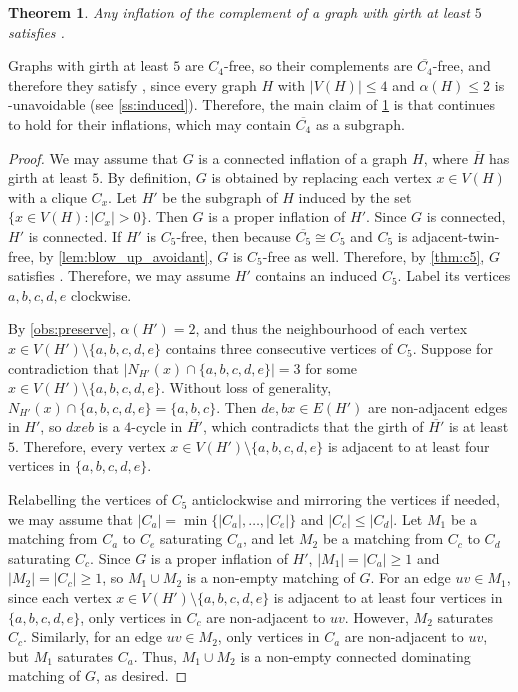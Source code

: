\documentclass[11pt]{article}
\numberwithin{equation}{section}
\theoremstyle{plain}
\newtheorem{thm}[equation]{Theorem}
\theoremstyle{definition}
\renewcommand{\geq}{\geqslant}
\renewcommand{\leq}{\leqslant}
\begin{document}
\begin{thm}
    \label{thm:girth_5}
    Any inflation of the complement of a graph with girth at least $5$ satisfies .
\end{thm}
Graphs with girth at least $5$ are $C_4$-free, so their complements are $\overline{C_4}$-free, and therefore they satisfy , since every graph $H$ with $|V(H)| \leq 4$ and $\alpha(H) \leq 2$ is -unavoidable (see \cref{ss:induced}). Therefore, the main claim of \cref{thm:girth_5} is that  continues to hold for their inflations, which may contain $\overline{C_4}$ as a subgraph.
\begin{proof}
    We may assume that $G$ is a connected inflation of a graph $H$, where $\overline{H}$ has girth at least $5$. By definition, $G$ is obtained by replacing each vertex $x \in V(H)$ with a clique $C_x$. Let $H'$ be the subgraph of $H$ induced by the set $\{x \in V(H): |C_x| > 0\}$. Then $G$ is a proper inflation of $H'$. Since $G$ is connected, $H'$ is connected. If $H'$ is $C_5$-free, then because $\overline{C_5} \cong C_5$ and $C_5$ is adjacent-twin-free, by \cref{lem:blow_up_avoidant}, $G$ is $C_5$-free as well. Therefore, by \cref{thm:c5}, $G$ satisfies . Therefore, we may assume $H'$ contains an induced $C_5$. Label its vertices $a,b,c,d,e$ clockwise.

    By \cref{obs:preserve}, $\alpha(H') = 2$, and thus the neighbourhood of each vertex $x \in V(H') \setminus \{a,b,c,d,e\}$ contains three consecutive vertices of $C_5$. Suppose for contradiction that $|N_{H'}(x) \cap \{a,b,c,d,e\}| = 3$ for some $x \in V(H') \setminus \{a,b,c,d,e\}$. Without loss of generality, $N_{H'}(x) \cap \{a,b,c,d,e\} = \{a,b,c\}$. Then $de, bx \in E(H')$ are non-adjacent edges in $H'$, so $dxeb$ is a $4$-cycle in $\overline{H'}$, which contradicts that the girth of $\overline{H'}$ is at least $5$.
    Therefore, every vertex $x \in V(H') \setminus \{a,b,c,d,e\}$ is adjacent to at least four vertices in $\{a,b,c,d,e\}$.

    Relabelling the vertices of $C_5$ anticlockwise and mirroring the vertices if needed, we may assume that $|C_a| = \min\{|C_a|, \dots, |C_e|\}$ and $|C_c| \leq |C_d|$. Let $M_1$ be a matching from $C_a$ to $C_e$ saturating $C_a$, and let $M_2$ be a matching from $C_c$ to $C_d$ saturating $C_c$. Since $G$ is a proper inflation of $H'$, $|M_1| = |C_a| \geq 1$ and $|M_2| = |C_c| \geq 1$, so $M_1 \cup M_2$ is a non-empty matching of $G$. For an edge $uv \in M_1$, since each vertex $x \in V(H') \setminus \{a,b,c,d,e\}$ is adjacent to at least four vertices in $\{a,b,c,d,e\}$, only vertices in $C_c$ are non-adjacent to $uv$. However, $M_2$ saturates $C_c$. Similarly, for an edge $uv \in M_2$, only vertices in $C_a$ are non-adjacent to $uv$, but $M_1$ saturates $C_a$. Thus, $M_1 \cup M_2$ is a non-empty connected dominating matching of $G$, as desired.
\end{proof}
\end{document}
